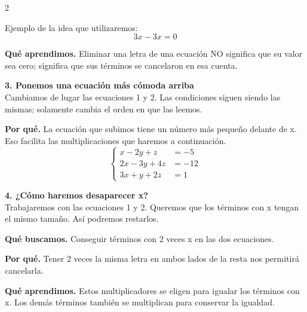 \documentclass[11pt,a4paper,landscape]{article}
\begin{document}
\begin{multicols*}{2}
\begin{minipage}{\linewidth}
\par\smallskip Ejemplo de la idea que utilizaremos:
\[3x-3x=0\]
\par\smallskip\textbf{Qué aprendimos.} Eliminar una letra de una ecuación NO significa que su valor sea cero; significa que sus términos se cancelaron en esa cuenta.
\end{minipage}\par\medskip
\noindent\begin{minipage}{\linewidth}\textbf{3. Ponemos una ecuación más cómoda arriba}\\[2pt]Cambiamos de lugar las ecuaciones 1 y 2. Las condiciones siguen siendo las mismas; solamente cambia el orden en que las leemos.
\par\smallskip\textbf{Por qué.} La ecuación que subimos tiene un número más pequeño delante de x. Eso facilita las multiplicaciones que haremos a continuación.
\[\left\{\begin{aligned}x - 2y + z &= -5\\2x - 3y + 4z &= -12\\3x + y + 2z &= 1\end{aligned}\right.\]
\end{minipage}\par\medskip
\noindent\begin{minipage}{\linewidth}\textbf{4. ¿Cómo haremos desaparecer x?}\\[2pt]Trabajaremos con las ecuaciones 1 y 2. Queremos que los términos con x tengan el mismo tamaño. Así podremos restarlos.
\par\smallskip\textbf{Qué buscamos.} Conseguir términos con 2 veces x en las dos ecuaciones.
\par\smallskip\textbf{Por qué.} Tener 2 veces la misma letra en ambos lados de la resta nos permitirá cancelarla.
\par{}\par\smallskip
\par\smallskip\textbf{Qué aprendimos.} Estos multiplicadores se eligen para igualar los términos con x. Los demás términos también se multiplican para conservar la igualdad.

\end{minipage}
\end{multicols*}
\end{document}
